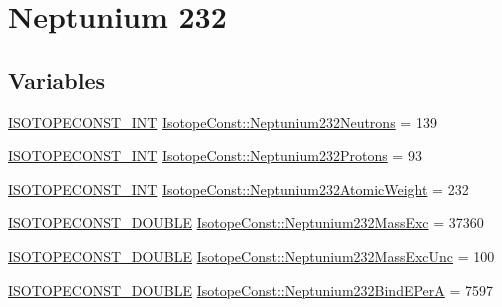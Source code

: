\hypertarget{group___isotope_const-_neptunium-_np232}{}\section{Neptunium 232}
\label{group___isotope_const-_neptunium-_np232}
\subsection*{Variables}
\begin{DoxyCompactItemize}
\item 
\mbox{\hyperlink{group___isotope_const-_macros_ga5f18360b3e99483a35c32d789e62621c}{I\+S\+O\+T\+O\+P\+E\+C\+O\+N\+S\+T\+\_\+\+I\+NT}} \mbox{\hyperlink{group___isotope_const-_neptunium-_np232_gab6e58a78024547a535317040dc616247}{Isotope\+Const\+::\+Neptunium232\+Neutrons}} = 139
\item 
\mbox{\hyperlink{group___isotope_const-_macros_ga5f18360b3e99483a35c32d789e62621c}{I\+S\+O\+T\+O\+P\+E\+C\+O\+N\+S\+T\+\_\+\+I\+NT}} \mbox{\hyperlink{group___isotope_const-_neptunium-_np232_ga7cd1b1843e39e864f90d9309803b918b}{Isotope\+Const\+::\+Neptunium232\+Protons}} = 93
\item 
\mbox{\hyperlink{group___isotope_const-_macros_ga5f18360b3e99483a35c32d789e62621c}{I\+S\+O\+T\+O\+P\+E\+C\+O\+N\+S\+T\+\_\+\+I\+NT}} \mbox{\hyperlink{group___isotope_const-_neptunium-_np232_ga3981ee9cab151652728f0735493fd92f}{Isotope\+Const\+::\+Neptunium232\+Atomic\+Weight}} = 232
\item 
\mbox{\hyperlink{group___isotope_const-_macros_ga8f45a7272ce02c0b4c65c44636ed719a}{I\+S\+O\+T\+O\+P\+E\+C\+O\+N\+S\+T\+\_\+\+D\+O\+U\+B\+LE}} \mbox{\hyperlink{group___isotope_const-_neptunium-_np232_gaf58614ed565d967f793e6b57b1016778}{Isotope\+Const\+::\+Neptunium232\+Mass\+Exc}} = 37360
\item 
\mbox{\hyperlink{group___isotope_const-_macros_ga8f45a7272ce02c0b4c65c44636ed719a}{I\+S\+O\+T\+O\+P\+E\+C\+O\+N\+S\+T\+\_\+\+D\+O\+U\+B\+LE}} \mbox{\hyperlink{group___isotope_const-_neptunium-_np232_ga1f593476b4beb713295d569b8fb7ee3a}{Isotope\+Const\+::\+Neptunium232\+Mass\+Exc\+Unc}} = 100
\item 
\mbox{\hyperlink{group___isotope_const-_macros_ga8f45a7272ce02c0b4c65c44636ed719a}{I\+S\+O\+T\+O\+P\+E\+C\+O\+N\+S\+T\+\_\+\+D\+O\+U\+B\+LE}} \mbox{\hyperlink{group___isotope_const-_neptunium-_np232_ga5dd097ec82839342fa80e2998970fcd8}{Isotope\+Const\+::\+Neptunium232\+Bind\+E\+PerA}} = 7597
\item 

\end{DoxyCompactItemize}
